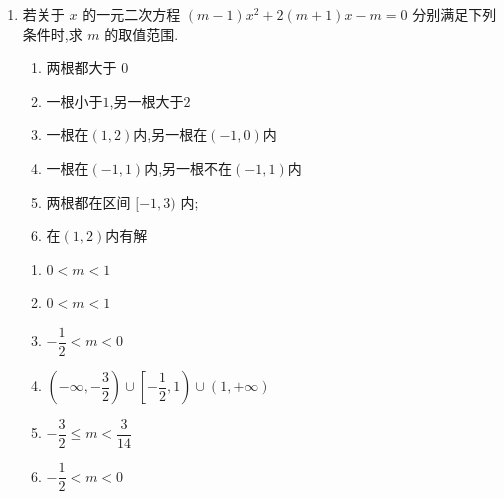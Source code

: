 \begin{enumerate}
    \item 若关于 $x$ 的一元二次方程 $\left( {m - 1}\right) {x}^{2} + 2\left( {m + 1}\right) x - m = 0$ 分别满足下列条件时,求 $m$ 的取值范围.
    \begin{enumerate}
        \item 两根都大于 $0$
        \item 一根小于$1$,另一根大于$2$
        \item 一根在$(1,2)$内,另一根在$(-1,0)$内
        \item 一根在$(-1,1)$内,另一根不在$(-1,1)$内
        \item 两根都在区间 $[-1,3)$ 内;
        \item 在$(1,2)$内有解
    \end{enumerate}
    \begin{jieda}
        \begin{enumerate}
            \item $0 < m < 1$
            \item $0 < m < 1$
            \item $- \dfrac{1}{2} < m < 0$
            \item $\left( {-\infty , - \dfrac{3}{2}}\right)  \cup  \left[  {-\dfrac{1}{2},1}\right)  \cup  \left( {1, + \infty }\right)$
            \item $- \dfrac{3}{2} \leq  m < \dfrac{3}{14}$
            \item $- \dfrac{1}{2} < m < 0$
        \end{enumerate}
    \end{jieda}


\end{enumerate}
